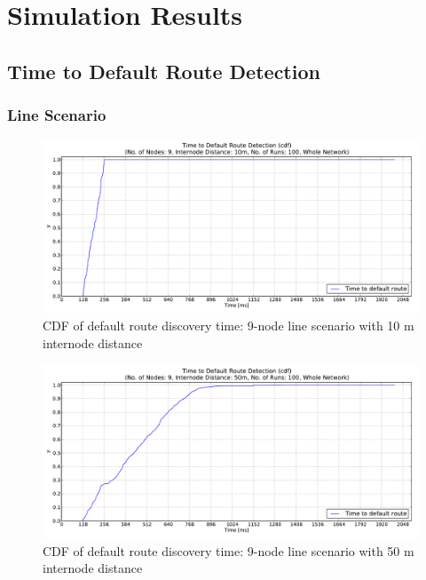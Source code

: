 \chapter{Simulation Results}

\section{Time to Default Route Detection}
\label{Appx:cdf}
\subsection{Line Scenario}
\label{Appx:cdf:line}
\begin{figure}[htpb]
  \begin{center}
    \leavevmode
      \includegraphics[scale=0.38]
      {Pics/results/9/MRHOF/line/dist10_montecarlo_cdf_hist.pdf}
   \caption{CDF of default route discovery time: 9-node line scenario with 10 m internode distance}
   \label{fig:9_MRHOF_line_10_cdf}
  \end{center}
\end{figure}

\begin{figure}[htpb]
  \begin{center}
    \leavevmode
        \includegraphics[scale=0.38]
      {Pics/results/9/MRHOF/line/dist50_montecarlo_cdf_hist.pdf}
   \caption{CDF of default route discovery time: 9-node line scenario with 50 m internode distance}
   \label{fig:9_MRHOF_line_50_cdf}
  \end{center}
\end{figure}

